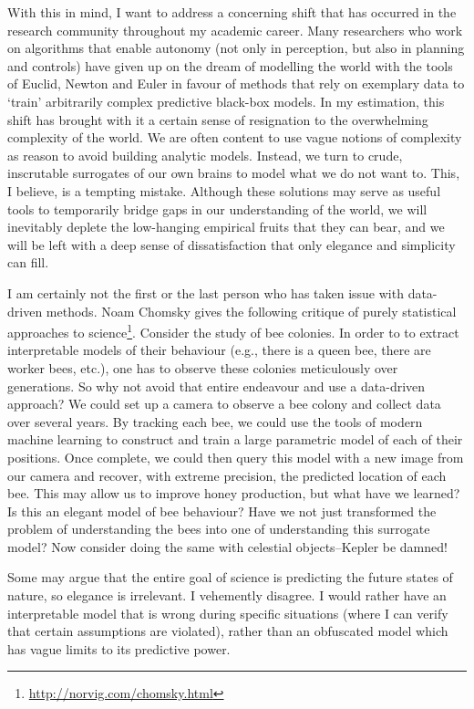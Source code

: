With this in mind, I want to address a concerning shift that has occurred in the research community throughout my academic career. Many researchers who work on algorithms that enable autonomy (not only in perception, but also in planning and controls) have given up on the dream of modelling the world with the tools of Euclid, Newton and Euler in favour of methods that rely on exemplary data to `train' arbitrarily complex predictive black-box models. In my estimation, this shift has brought with it a certain sense of resignation to the overwhelming complexity of the world. We are often content to use vague notions of complexity as reason to avoid building analytic models. Instead, we turn to crude, inscrutable surrogates of our own brains to model what we do not want to. This, I believe, is a tempting mistake. Although these solutions may serve as useful tools to temporarily bridge gaps in our understanding of the world, we will inevitably deplete the low-hanging empirical fruits that they can bear, and we will be left with a deep sense of dissatisfaction that only elegance and simplicity can fill. 

I am certainly not the first or the last person who has taken issue with data-driven methods. Noam Chomsky gives the following critique of purely statistical approaches to science\footnote{\url{http://norvig.com/chomsky.html}}. Consider the study of bee colonies. In order to to extract interpretable models of their behaviour (e.g., there is a queen bee, there are worker bees, etc.), one has to observe these colonies meticulously over generations. So why not avoid that entire endeavour and use a data-driven approach? We could set up a camera to observe a bee colony and collect data over several years. By tracking each bee, we could use the tools of modern machine learning to construct and train a large parametric model of each of their positions. Once complete, we could then query this model with a new image from our camera and recover, with extreme precision, the predicted location of each bee. This may allow us to improve honey production, but what have we learned? Is this an elegant model of bee behaviour? Have we not just transformed the problem of understanding the bees into one of understanding this surrogate model? Now consider doing the same with celestial objects--Kepler be damned!

Some may argue that the entire goal of science is predicting the future states of nature, so elegance is irrelevant. I vehemently disagree. I would rather have an interpretable model that is wrong during specific situations (where I can verify that certain assumptions are violated), rather than an obfuscated model which has vague limits to its predictive power.

